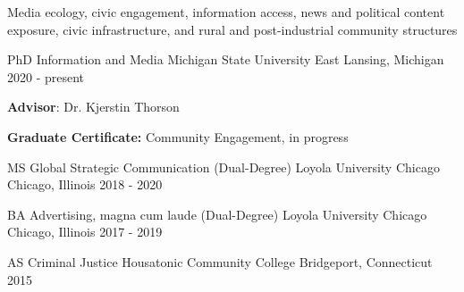 

 \begin{small} \color{black} 
 Media ecology, civic engagement, information access, news and political content exposure, civic infrastructure, and rural and post-industrial community structures
\end{small}




\begin{cventries}

  \cventry
    {PhD Information and Media} %
    {Michigan State University} %
    {East Lansing, Michigan} %
    {2020 - present} %
    {
      \begin{cvitems} %
              \item {\textbf{Advisor}: Dr. Kjerstin Thorson}
                \item {\textbf{Graduate Certificate:} Community Engagement, in progress}
      \end{cvitems}
    }

  \cventry
    {MS Global Strategic Communication (Dual-Degree)} %
    {Loyola University Chicago} %
    {Chicago, Illinois} %
    {2018 - 2020} %
    {
    }
    
\cventry
    {BA Advertising, magna cum laude (Dual-Degree)} %
    {Loyola University Chicago} %
    {Chicago, Illinois} %
    {2017 - 2019} %
    {
    }

  \cventry
    {AS Criminal Justice} %
    {Housatonic Community College} %
    {Bridgeport, Connecticut} %
    {2015} %
{
    }
\end{cventries}
